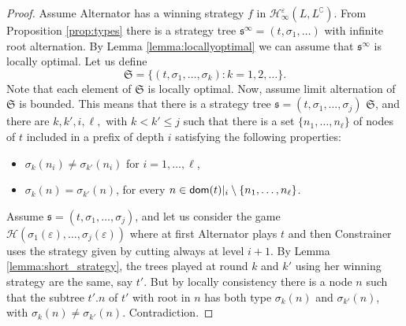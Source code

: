 \begin{proof}
Assume Alternator has a winning strategy $f$ in  $\mathcal{H}^\varepsilon_\infty(L, L^\complement)$. From Proposition \ref{prop:types} there is a strategy tree $\mathfrak{s}^\infty = (t,\sigma_1,\dots) $ with infinite root alternation. 
 By Lemma \ref{lemma:locallyoptimal} we can assume that $\mathfrak{s}^\infty$ is  locally optimal. Let us define 
\[ \mathfrak{S}= \{ (t,\sigma_1,\dots,\sigma_k): k=1,2,\dots\}. \]
Note that each element of $\mathfrak{S}$ is locally optimal.
Now, assume limit alternation of $\mathfrak{S}$ is bounded.
This means that there is a strategy tree $\mathfrak{s}=(t, \sigma_1, \dots, \sigma_j)$ $ \mathfrak{S}$, and there are $k, k', i, \ell, $ with $k < k' \leq j$ such that
 there is a set $\{n_1, \dots, n_\ell\}$ of nodes of $t$ included in a prefix of depth $i$ satisfying the following properties:
\begin{itemize}
\item $\sigma_k(n_i)\neq \sigma_{k'}(n_i)$ for $i=1, \dots, \ell$,
\item $\sigma_k(n)= \sigma_{k'}(n)$, for every $n \in \mathsf{dom}(t)|_i \setminus \{n_1, \dots, n_\ell\}$.
\end{itemize}
Assume $\mathfrak{s}=(t, \sigma_1, \dots, \sigma_j)$, and let us consider the game $\mathcal{H}( \sigma_1(\varepsilon), \dots, \sigma_j(\varepsilon))$ where at first Alternator plays $t$ and then Constrainer uses the strategy given by cutting always at level $i+1$. By Lemma \ref{lemma:short_strategy}, the trees played at round $k$ and $k'$ using her winning strategy are the same, say $t'$. But by locally consistency there is a node $n$ such that the subtree $t'.n$ of $t'$ with root in $n$ has both type $\sigma_k(n)$ and $\sigma_{k'}(n)$, with $\sigma_k(n) \neq \sigma_{k'}(n)$. Contradiction.
  \end{proof}
